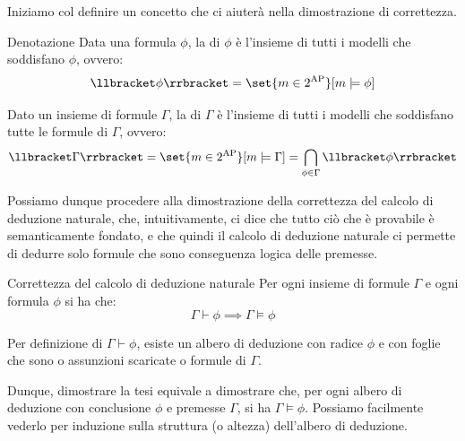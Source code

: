 Iniziamo col definire un concetto che ci aiuterà nella dimostrazione di correttezza.

\begin{definition}{Denotazione}
  Data una formula \(\phi\), la  di \(\phi\) è l'insieme di tutti i modelli che soddisfano \(\phi\), ovvero:
  \[\den{\phi} = \set{m \in 2^{\AP}}[ m \models \phi]\]

  Dato un insieme di formule \(\Gamma\), la  di \(\Gamma\) è l'insieme di tutti i modelli che soddisfano tutte le formule di \(\Gamma\), ovvero:
  \[\den{\Gamma} = \set{m \in 2^{\AP}}[ m \models \Gamma] = \bigcap_{\phi \in \Gamma} \den{\phi}\]
\end{definition}

Possiamo dunque procedere alla dimostrazione della correttezza del calcolo di deduzione naturale, che, intuitivamente, ci dice che tutto ciò che è provabile è semanticamente fondato, e che quindi il calcolo di deduzione naturale ci permette di dedurre solo formule che sono conseguenza logica delle premesse.

\begin{theorem}{Correttezza del calcolo di deduzione naturale}
  Per ogni insieme di formule \(\Gamma\) e ogni formula \(\phi\) si ha che:
  \[\Gamma \vdash \phi \implies \Gamma \models \phi\]
\end{theorem}

Per definizione di \(\Gamma\vdash\phi\), esiste un albero di deduzione con radice \(\phi\) e con foglie che sono o assunzioni scaricate o formule di \(\Gamma\).

Dunque, dimostrare la tesi equivale a dimostrare che, per ogni albero di deduzione con conclusione \(\phi\) e premesse \(\Gamma\), si ha \(\Gamma\models\phi\).
Possiamo facilmente vederlo per induzione sulla struttura (o altezza) dell'albero di deduzione.

